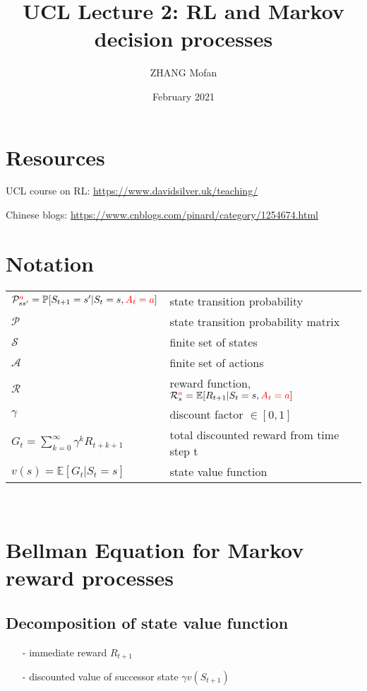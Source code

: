 \documentclass{article}
\title{UCL Lecture 2: RL and Markov decision processes}
\author{ZHANG Mofan}
\date{February 2021}
\begin{document}
\maketitle
\setcounter{section}{-1}
\section{Resources}
UCL course on RL: \url{https://www.davidsilver.uk/teaching/}

Chinese blogs: \url{https://www.cnblogs.com/pinard/category/1254674.html}

\section{Notation}
\begin{tabular}{lp{}}
$\mathcal{P}_{ss'}^{\textcolor{red}{a}} = \mathbb{P}[S_{t+1} = s'|S_t = s, {\color{red}A_t = a}]$ & state transition probability\\

$\mathcal{P}$ & state transition probability matrix\\

$\mathcal{S}$ & finite set of states\\

\color{red} $\mathcal{A}$ & finite set of actions\\

$\mathcal{R}$ & reward function, $\mathcal{R}_{s}^{\textcolor{red}{a}} = \mathbb{E}[R_{t+1}|S_t = s, {\color{red}A_t = a}]$\\

$\gamma$ & discount factor $\in [0, 1]$\\

$G_t = \sum^{\infty}_{k=0} \gamma^kR_{t+k+1}$ & total discounted reward from time step t\\

$v(s) = \mathbb{E}[G_t|S_t = s]$ & state value function\\
\end{tabular}\\

\section{Bellman Equation for Markov reward processes}
\subsection{Decomposition of state value function}
\begin{itemize}
    \item[-] immediate reward $R_{t+1}$
    \item[-] discounted value of successor state $\gamma v(S_{t+1})$
\end{itemize}
\end{document}
